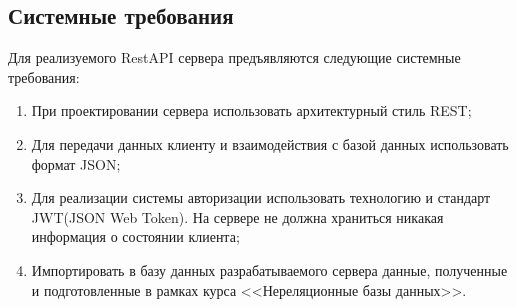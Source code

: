 \subsection{Системные требования}

Для реализуемого RestAPI сервера предъявляются следующие системные требования:

\begin{enumerate}
	\item При проектировании сервера использовать архитектурный стиль REST;
	\item Для передачи данных клиенту и взаимодействия с базой данных использовать формат JSON;
	\item Для реализации системы авторизации использовать технологию и стандарт JWT(JSON Web Token). На сервере не должна храниться никакая  информация о состоянии клиента;
	\item Импортировать в базу данных разрабатываемого сервера данные, полученные и подготовленные в рамках курса <<Нереляционные базы данных>>.
\end{enumerate}


\clearpage